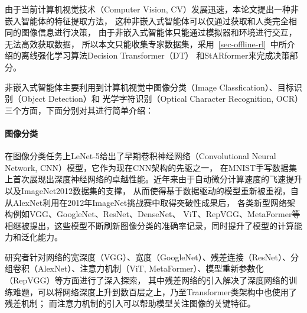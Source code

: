 由于当前计算机视觉技术（Computer Vision, CV）发展迅速，本论文提出一种非嵌入智能体的特征提取方法，
这种非嵌入式智能体可以仅通过获取和人类完全相同的图像信息进行决策，
由于非嵌入式智能体只能通过模拟器和环境进行交互，无法高效获取数据，
所以本文只能收集专家数据集，采用~\ref{sec-offline-rl}~中所介绍的离线强化学习算法Decision Transformer（DT）
和StARformer来完成决策部分。

非嵌入式智能体主要利用到计算机视觉中图像分类（Image Classfication）、目标识别（Object Detection）和
光学字符识别（Optical Character Recognition, OCR）三个方面，下面分别对其进行简单介绍：
\paragraph*{图像分类}在图像分类任务上LeNet-5给出了早期卷积神经网络（Convolutional Neural Network, CNN）模型，它作为现在CNN架构的先驱之一，
在MNIST手写数据集上首次展现出深度神经网络的卓越性能。近年来由于自动微分计算速度的飞速提升以及ImageNet2012数据集的支撑，
从而使得基于数据驱动的模型重新被重视，自从AlexNet利用在2012年ImageNet挑战赛中取得突破性成果后，
各类新型网络架构例如VGG、GoogleNet、ResNet、DenseNet、
ViT、RepVGG、MetaFormer等相继被提出，这些模型不断刷新图像分类的准确率记录，同时提升了模型的计算能力和泛化能力。

研究者针对网络的宽深度（VGG）、宽度（GoogleNet）、残差连接（ResNet）、分组卷积（AlexNet）、注意力机制（ViT, MetaFormer）、模型重新参数化（RepVGG）等方面进行了深入探索，
其中残差网络的引入解决了深度网络的训练难题，可以将网络深度上升到数百层之上，乃至Transformer类架构中也使用了残差机制；
而注意力机制的引入可以帮助模型关注图像的关键特征。
